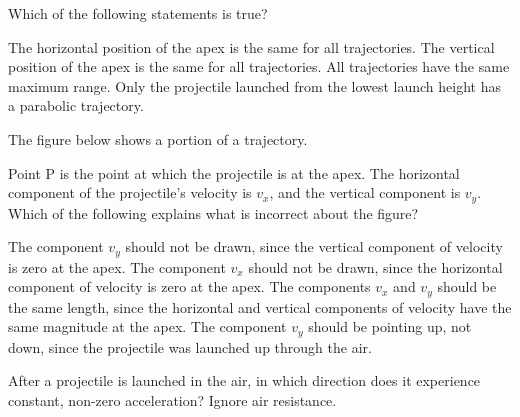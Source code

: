\documentclass[answers]{exam}
\begin{document}
\begin{questions}
Which of the following statements is true?

\begin{randomizechoices}
    \correctchoice The horizontal position of the apex is the same for all trajectories.
    \choice The vertical position of the apex is the same for all trajectories.
    \choice All trajectories have the same maximum range.
    \choice Only the projectile launched from the lowest launch height has a parabolic trajectory.
\end{randomizechoices}

\clearpage


\question
The figure below shows a portion of a trajectory.

\begin{center}
\end{center}

Point P is the point at which the projectile is at the apex. The horizontal component of the projectile's velocity is $v_x$, and the vertical component is $v_y$. Which of the following explains what is incorrect about the figure?

\begin{randomizechoices}
    \correctchoice The component $v_y$ should not be drawn, since the vertical component of velocity is zero at the apex.
    \choice The component $v_x$ should not be drawn, since the horizontal component of velocity is zero at the apex.
    \choice The components $v_x$ and $v_y$ should be the same length, since the horizontal and vertical components of velocity have the same magnitude at the apex. 
    \choice The component $v_y$ should be pointing up, not down, since the projectile was launched up through the air.
\end{randomizechoices}

\question
After a projectile is launched in the air, in which direction does it experience constant, non-zero acceleration? Ignore air resistance.


\end{questions}
\end{document}
